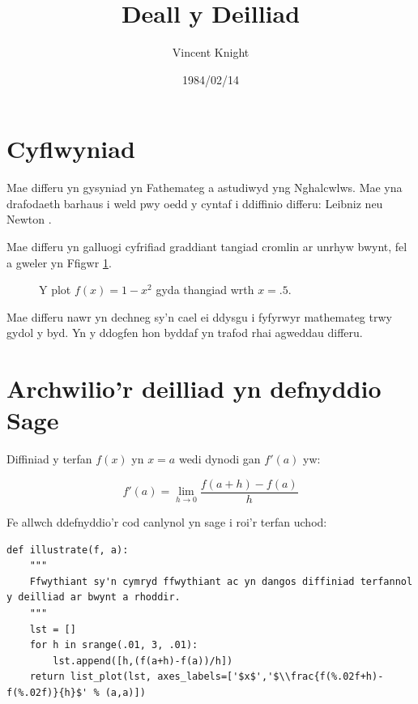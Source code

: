 \documentclass[a4paper]{article}
\title{Deall y Deilliad}
\author{Vincent Knight}
\date{1984/02/14}
\begin{document}
\maketitle

\section{Cyflwyniad}

Mae differu yn gysyniad yn Fathemateg a astudiwyd yng Nghalcwlws. Mae yna drafodaeth barhaus i weld pwy oedd y cyntaf i ddiffinio differu: Leibniz neu Newton \cite{bardi2006calculus}.

Mae differu yn galluogi cyfrifiad graddiant tangiad cromlin ar unrhyw bwynt, fel a gweler yn Ffigwr \ref{exampleplot}.


\begin{figure}[!htbp]
\begin{center}
\end{center}
\caption{Y plot $f(x)=1-x^2$ gyda thangiad wrth $x=.5$.}\label{exampleplot}
\end{figure}

Mae differu nawr yn dechneg sy'n cael ei ddysgu i fyfyrwyr mathemateg trwy gydol y byd. Yn y ddogfen hon byddaf yn trafod rhai agweddau differu.


\section{Archwilio'r deilliad yn defnyddio Sage}

Diffiniad y terfan $f(x)$ yn $x=a$ wedi dynodi gan $f'(a)$ yw:

\begin{equation}
f'(a) = \lim_{h\to0}\frac{f(a+h)-f(a)}{h}
\end{equation}

Fe allwch ddefnyddio'r cod canlynol yn sage i roi'r terfan uchod:

\begin{verbatim}
def illustrate(f, a):
    """
    Ffwythiant sy'n cymryd ffwythiant ac yn dangos diffiniad terfannol y deilliad ar bwynt a rhoddir.
    """
    lst = []
    for h in srange(.01, 3, .01):
    	lst.append([h,(f(a+h)-f(a))/h])
    return list_plot(lst, axes_labels=['$x$','$\\frac{f(%.02f+h)-f(%.02f)}{h}$' % (a,a)])
\end{verbatim}
\end{document}
